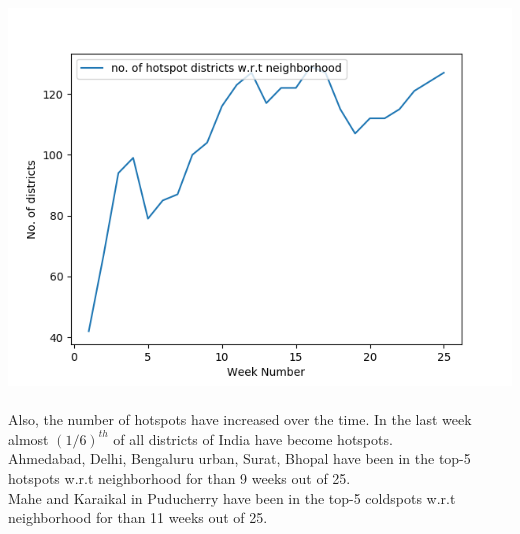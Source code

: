 \documentclass[20pt]{letter}
\begin{document}
\begin{enumerate}
{\includegraphics[scale=0.8]{analysis1.png}\\\\
Also, the number of hotspots have increased over the time. In the last week almost $(1/6)^{th}$ of all districts of India have become hotspots.\\
Ahmedabad, Delhi, Bengaluru urban, Surat, Bhopal have been in the top-5 hotspots w.r.t neighborhood for than 9 weeks out of 25.\\
Mahe and Karaikal in Puducherry have been in the top-5 coldspots w.r.t neighborhood for than 11 weeks out of 25.

}

\end{enumerate}
\end{document}
